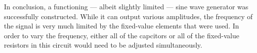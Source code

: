 In conclusion, a functioning --- albeit slightly limited --- sine wave
generator was successfully constructed.  While it can output various
amplitudes, the frequency of the signal is very much limited by the fixed-value
elements that were used.  In order to vary the frequency, either all of the
capcitors or all of the fixed-value resistors in this circuit would need to be
adjusted simultaneously.
